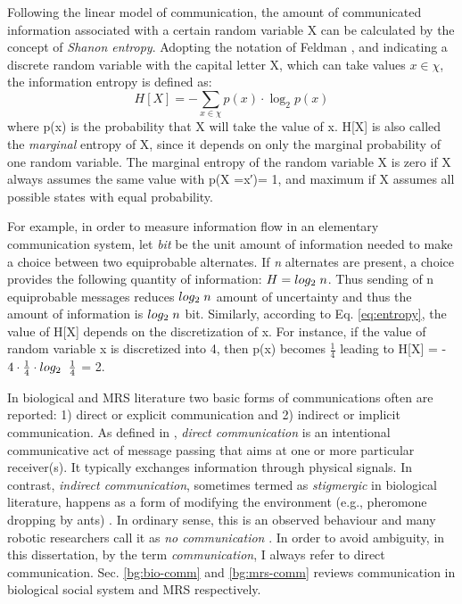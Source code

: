 Following the linear model of communication, the amount of communicated information associated with a certain random variable X can be calculated by the concept of {\em Shanon entropy}. Adopting the notation of Feldman \cite{Feldman1997}, and indicating a discrete random variable with the capital letter X, which can take values $x \in \chi$, the information entropy is defined as:
\begin{equation}
\label{eq:entropy}
H[X] = - \sum_{x \in \chi } p(x) \cdot  \log_{2} p(x)
\end{equation}
where p(x) is the probability that X will take the value of x. H[X] is also called the {\em marginal} entropy of X, since it depends on only the marginal probability of one random variable. The marginal entropy of the random variable X is zero if X always assumes the same value with p(X =x′)= 1, and maximum if X assumes all possible states with equal probability.

For example, in order to measure information flow in an elementary communication system, let {\em bit} be the unit amount of information needed to make a choice between two equiprobable alternates. If {\em n} alternates are present, a choice provides the following quantity of information: $H = log_{2} \hspace{1mm} n $. Thus sending of n equiprobable messages reduces $log_{2} \hspace{1mm} n $ amount of uncertainty and thus the amount of information is  $log_{2} \hspace{1mm} n $ bit.  Similarly, according to Eq. \ref{eq:entropy}, the value of H[X] depends on the discretization of x. For instance, if the value of random variable x is discretized into 4, then p(x) becomes $\frac{1}{4}$  leading to H[X] = - $ 4 \cdot \frac{1}{4} \cdot log_{2} \hspace{2mm} \frac{1}{4}$  = 2.

In biological and MRS literature two basic forms of communications often are reported: 1) direct or explicit communication and 2) indirect or implicit communication. As defined in \cite{Mataric1998}, {\em direct communication} is an intentional communicative act of message passing that aims at one or more particular receiver(s). It typically exchanges information through physical signals. In contrast, {\em indirect communication}, sometimes termed as {\em stigmergic} in biological literature, happens as a form of modifying the environment (e.g., pheromone dropping by ants) \cite{Bonabeau+1999}. In ordinary sense, this is an observed behaviour and many robotic researchers call it as {\em no communication} \cite{Labella2007}. In order to avoid ambiguity,  in this dissertation, by the term {\em communication}, I always refer to direct communication. Sec. \ref{bg:bio-comm} and \ref{bg:mrs-comm} reviews communication in biological social system and MRS respectively.
